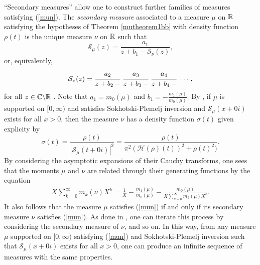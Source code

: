 \documentclass[12pt]{article}
\begin{document}
``Secondary measures'' allow one to construct further families of measures satisfying (\ref{mun}).  The {\it secondary measure} associated to a measure $\mu$ on ${\mathbb R}$ satisfying the hypotheses of Theorem \ref{mutheorem1bb} with density function $\rho(t)$   is the unique measure $\nu$ on ${\mathbb R}$ such that
$${\mathcal S}_\mu(z) = \frac{a_1}{z+b_1 - {\mathcal S}_{\nu}(z)},$$
or, equivalently,
$${\mathcal S}_{\nu}(z) =   \cfrac{a_2}{z+b_2 \,-} \  \cfrac{a_3}{z+b_3 \,-} \  \cfrac{a_4}{z+b_4 \,-}  \ \cdots,$$
for all $z \in {\mathbb C}\backslash {\mathbb R}$ \cite[p.\ 68]{sher} \cite{grou}.   Note that $a_1 = m_0(\mu)$ and $b_1 = -\frac{m_1(\mu)}{m_0(\mu)}.$  By \cite[p.\ 374]{grou}, if $\mu$ is supported on $[0,\infty)$ and satisfies Sokhotski-Plemelj inversion and ${\mathcal S}_\mu(x+0i)$  exists for all $x> 0$, then the measure $\nu$ has a density function $\sigma(t)$ given explicity by
$$\sigma(t) = \frac{\rho(t)}{| {\mathcal S}_\mu(t+0i)|^2} = \frac{\rho(t)}{\pi^2({\mathcal H}(\rho)(t))^2+ \rho(t)^2)}.$$
By considering the asymptotic expansions of their Cauchy transforms, one sees that the moments  $\mu$ and $\nu$ are related through their generating functions  by the equation
\begin{align}\label{munu}
X\sum_{k = 0}^\infty m_k(\nu) X^{k}  =\frac{1}{X}- \frac{m_1(\mu)}{m_0(\mu)} -\frac{m_0(\mu)}{X\sum_{k = 0}^\infty m_k(\mu) X^{k}}.
\end{align}
It also follows that the measure $\mu$ satisfies (\ref{mun}) if and only if its secondary measure $\nu$ satisfies (\ref{mun}).  As done in \cite{groux2}, one can  iterate this process by considering the secondary measure of $\nu$, and so on.  In this way, from any measure $\mu$ supported on $[0,\infty)$ satisfying (\ref{mun}) and Sokhotski-Plemelj inversion such that ${\mathcal S}_\mu(x+0i)$  exists for all $x> 0$, one can produce an infinite sequence of measures with the same properties.
\end{document}
